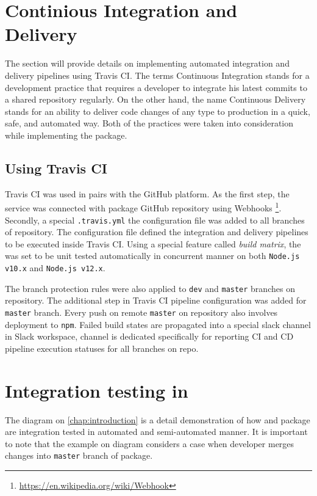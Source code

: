 \section{Continious Integration and Delivery}

The section will provide details on implementing automated integration and delivery pipelines using Travis CI.
The terms Continuous Integration stands for a development practice that requires a developer to integrate his latest commits to a shared repository regularly. On the other hand, the name Continuous Delivery stands for an ability to deliver code changes of any type to production in a quick, safe, and automated way. Both of the practices were taken into consideration while implementing the \lpas{} package. 

\subsection{Using Travis CI}

Travis CI was used in pairs with the GitHub platform. As the first step, the service was connected with \lpas{} package GitHub repository using Webhooks \footnote{\url{https://en.wikipedia.org/wiki/Webhook}}. Secondly, a special \texttt{.travis.yml} the configuration file was added to all branches of \lpas{} repository. The configuration file defined the integration and delivery pipelines to be executed inside Travis CI. Using a special feature called \textit{build matrix}, the \lpas{} was set to be unit tested automatically in concurrent manner on both \texttt{Node.js v10.x} and \texttt{Node.js v12.x}. 

The branch protection rules were also applied to \texttt{dev} and \texttt{master} branches on \lpas{} repository. The additional step in Travis CI pipeline configuration was added for \texttt{master} branch. Every push on remote \texttt{master} on \lpas{} repository also involves deployment to \texttt{npm}. Failed build states are propagated into a special slack channel in \lpa{} Slack workspace, channel is dedicated specifically for reporting CI and CD pipeline execution statuses for all branches on \lpas{} repo.

\section{Integration testing in \lpa{}}

The diagram on \autoref{chap:introduction} is a detail demonstration of how \lpa{} and \lpa{} package are integration tested in automated and semi-automated manner. It is important to note that the example on diagram considers a case when \lpas{} developer merges changes into \texttt{master} branch of \lpas{} package.

